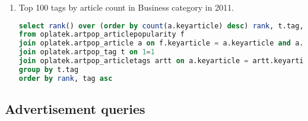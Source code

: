 \begin{enumerate}
\begin{lstlisting}[language=sql]
reads, sum(shares) over (partition by year) shares_total, shares/sum(shares) over (partition by year) shares_perc,
reads, sum(comments) over (partition by year) comments_total, comments/sum(comments) over (partition by year) comments_perc
from (
select a.publicationyear year, t.tag, sum(reads) reads, sum(comments) comments, sum(shares) shares
from oplatek.artpop_articlepopularity f
join oplatek.artpop_article a on f.keyarticle = a.keyarticle
join oplatek.artpop_tag t on t.tag in ('positive', 'negative')
join oplatek.artpop_articletags artt on a.keyarticle = artt.keyarticle and artt.keytag = t.keytag 
group by a.publicationyear, t.tag
order by year desc, tag
)
\end{lstlisting}
\item   Top 100 tags by article count in Business category in 2011.
\begin{lstlisting}[language=sql] 
select rank() over (order by count(a.keyarticle) desc) rank, t.tag, count(a.keyarticle) articles
from oplatek.artpop_articlepopularity f
join oplatek.artpop_article a on f.keyarticle = a.keyarticle and a.category = 'Business' and a.publicationyear = 2011
join oplatek.artpop_tag t on 1=1
join oplatek.artpop_articletags artt on a.keyarticle = artt.keyarticle and artt.keytag = t.keytag
group by t.tag
order by rank, tag asc
\end{lstlisting}
\end{enumerate}

\subsection*{Advertisement  queries} %
\label{sub:Advertisement queries}

